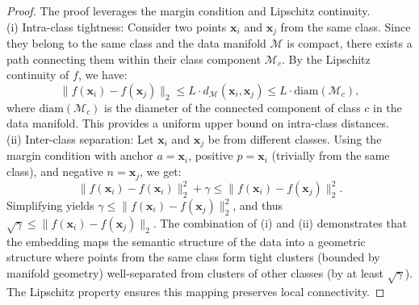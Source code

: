 \documentclass[a4paper,12pt,reqno]{amsart}
\theoremstyle{definition}
\theoremstyle{remark}
\begin{document}
\begin{proof}
	The proof leverages the margin condition and Lipschitz continuity.\\
(i) {Intra-class tightness:} Consider two points $\mathbf{x}_i$ and $\mathbf{x}_j$ from the same class. Since they belong to the same class and the data manifold $\mathcal{M}$ is compact, there exists a path connecting them within their class component $\mathcal{M}_c$. By the Lipschitz continuity of $f$, we have:
		\[
		\|f(\mathbf{x}_i) - f(\mathbf{x}_j)\|_2 \leq L \cdot d_{\mathcal{M}}(\mathbf{x}_i, \mathbf{x}_j) \leq L \cdot \text{diam}(\mathcal{M}_c),
		\]
		where $\text{diam}(\mathcal{M}_c)$ is the diameter of the connected component of class $c$ in the data manifold. This provides a uniform upper bound on intra-class distances.\\
(ii) {Inter-class separation:} Let $\mathbf{x}_i$ and $\mathbf{x}_j$ be from different classes. Using the margin condition with anchor $a = \mathbf{x}_i$, positive $p = \mathbf{x}_i$ (trivially from the same class), and negative $n = \mathbf{x}_j$, we get:
		\[
		\|f(\mathbf{x}_i) - f(\mathbf{x}_i)\|_2^2 + \gamma \leq \|f(\mathbf{x}_i) - f(\mathbf{x}_j)\|_2^2.
		\]
		Simplifying yields $\gamma \leq \|f(\mathbf{x}_i) - f(\mathbf{x}_j)\|_2^2$, and thus $\sqrt{\gamma} \leq \|f(\mathbf{x}_i) - f(\mathbf{x}_j)\|_2$.
	The combination of (i) and (ii) demonstrates that the embedding maps the semantic structure of the data into a geometric structure where points from the same class form tight clusters (bounded by manifold geometry) well-separated from clusters of other classes (by at least $\sqrt{\gamma}$). The Lipschitz property ensures this mapping preserves local connectivity.
\end{proof}
\end{document}
